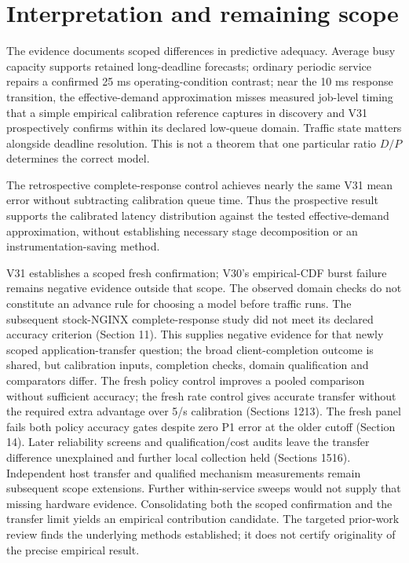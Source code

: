 \documentclass[11pt,a4paper]{article}
\begin{document}
\section{Interpretation and remaining scope}

The evidence documents scoped differences in predictive adequacy. Average busy
capacity supports retained long-deadline forecasts; ordinary periodic service
repairs a confirmed 25 ms operating-condition contrast; near the 10 ms response
transition, the effective-demand approximation misses measured job-level
timing that a simple empirical calibration reference captures in discovery
and V31 prospectively confirms within its declared low-queue domain.
Traffic state matters alongside deadline resolution. This is not a theorem
that one particular ratio $D/P$ determines the correct model.

The retrospective complete-response control achieves nearly the same V31
mean error without subtracting calibration queue time. Thus the prospective
result supports the calibrated latency distribution against the tested
effective-demand approximation, without establishing necessary stage
decomposition or an instrumentation-saving method.

V31 establishes a scoped fresh confirmation; V30's empirical-CDF burst failure
remains negative evidence outside that scope. The observed domain checks do
not constitute an advance rule for choosing a model before traffic runs.
The subsequent stock-NGINX complete-response study did not meet its declared
accuracy criterion (Section 11). This supplies negative evidence for that newly
scoped application-transfer question; the broad client-completion outcome is
shared, but calibration inputs, completion checks, domain qualification and
comparators differ. The fresh policy control improves a pooled comparison
without sufficient accuracy; the fresh rate control gives accurate transfer
without the required extra advantage over 5/s calibration (Sections 12\textendash{}13).
The fresh panel fails both policy accuracy gates despite zero P1 error at the
older cutoff (Section 14). Later reliability screens and qualification/cost
audits leave the transfer difference unexplained and further local collection
held (Sections 15\textendash{}16).
Independent host transfer and qualified mechanism
measurements remain subsequent scope extensions. Further within-service sweeps
would not supply that missing hardware evidence. Consolidating both the scoped
confirmation and the transfer limit yields an empirical contribution candidate.
The targeted prior-work review finds the underlying methods
established; it does not certify originality of the precise empirical result.
\end{document}
